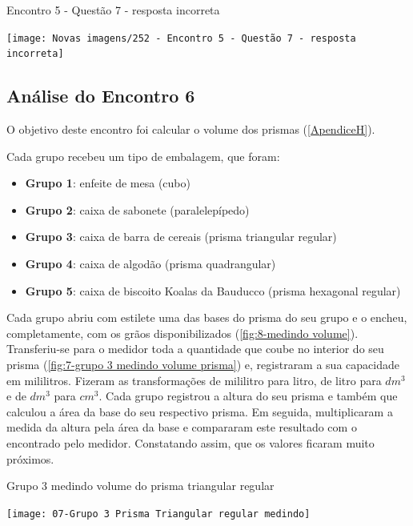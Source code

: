 \begin{CenteredFigure}
    \caption{Encontro 5 - Questão 7 - resposta incorreta} \label{fig: 252 - Encontro 5 - Questao 7 - resposta incorreta}
    \texttt{[image: Novas imagens/252 - Encontro 5 - Questão 7 - resposta incorreta]}
    \legend{\autoria}
\end{CenteredFigure}

\subsection{Análise do Encontro 6}

O objetivo deste encontro foi calcular o volume dos prismas (\autoref{ApendiceH}).

Cada grupo recebeu um tipo de embalagem, que foram:

\begin{itemize}
    \item \textbf{Grupo 1}: enfeite de mesa (cubo)
    \item \textbf{Grupo 2}: caixa de sabonete (paralelepípedo)
    \item \textbf{Grupo 3}: caixa de barra de cereais (prisma triangular regular)
    \item \textbf{Grupo 4}: caixa de algodão (prisma quadrangular)
    \item \textbf{Grupo 5}: caixa de biscoito Koalas da Bauducco (prisma hexagonal regular)
\end{itemize}

Cada grupo abriu com estilete uma das bases do prisma do seu grupo e o encheu, completamente, com os grãos disponibilizados (\autoref{fig:8-medindo volume}). Transferiu-se para o medidor toda a quantidade que coube no interior do seu prisma (\autoref{fig:7-grupo 3 medindo volume prisma}) e, registraram a sua capacidade em mililitros. Fizeram as transformações de mililitro para litro, de litro para $dm^3$ e de $dm^3$ para $cm^3$. Cada grupo registrou a altura do seu prisma e também que calculou a área da base do seu respectivo prisma. Em seguida, multiplicaram a medida da altura pela área da base e compararam este resultado com o encontrado pelo medidor. Constatando assim, que os valores ficaram muito próximos.

\begin{CenteredFigure}
    \caption{Grupo 3 medindo volume do prisma triangular regular} \label{fig:7-grupo 3 medindo volume prisma}
    \texttt{[image: 07-Grupo 3 Prisma Triangular regular medindo]}
    \legend{\autoria}
\end{CenteredFigure}

